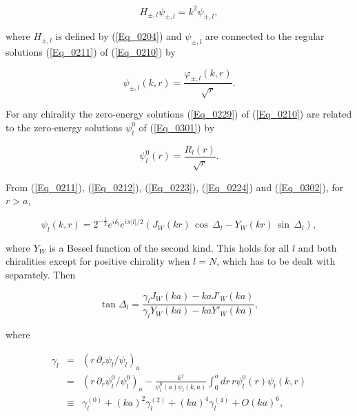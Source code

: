\documentclass[a4paper,twocolumn,showpacs,preprintnumbers,amsmath,amssymb]{revtex4}
\newcommand{\half}{\frac{1}{2}}
\begin{document}
\begin{equation}
\label{Eq_0301}
H_{\pm,l} \psi_{\pm,l} = k^2 \psi_{\pm,l},
\end{equation}

\noindent
where $H_{\pm,l}$ is defined by (\ref{Eq_0204}) and $\psi_{\pm,l}$ are
connected to the regular solutions (\ref{Eq_0211}) of (\ref{Eq_0210}) by

\begin{equation}
\label{Eq_0302}
\psi_{\pm,l}(k,r) = \frac{\varphi_{\pm,l}(k,r)}{\sqrt{r}}.
\end{equation}

\noindent
For any chirality the zero-energy solutions (\ref{Eq_0229}) of
(\ref{Eq_0210}) are related to the zero-energy solutions $\psi^0_l$ of
(\ref{Eq_0301}) by

\begin{equation}
\label{Eq_0303}
\psi^0_l(r) = \frac{R_l(r)}{\sqrt{r}}.
\end{equation}

From (\ref{Eq_0211}), (\ref{Eq_0212}), (\ref{Eq_0223}),
(\ref{Eq_0224}) and (\ref{Eq_0302}), for $r > a$,

\begin{widetext}
\begin{equation}
\label{Eq_0304}
\psi_l(k,r) = 2^{-\half} e^{i\delta_l} e^{i\pi|l|/2}
  (J_W(kr) \, \cos \, \Delta_l - Y_W(kr) \, \sin \, \Delta_l),
\end{equation}
\end{widetext}


\noindent
where $Y_W$ is a Bessel function of the second kind. This holds for
all $l$ and both chiralities except for positive chirality when $l = N$,
which has to be dealt with separately. Then

\begin{equation}
\label{Eq_0305}
\tan \Delta_l =
  \frac{\gamma_l J_W(ka) - ka J'_W(ka)}{\gamma_l Y_W(ka) - ka Y'_W(ka)},
\end{equation}

\noindent
where

\begin{eqnarray}
\label{Eq_0306}
\nonumber
\gamma_l
  &=& (r \, \partial_r \psi_l / \psi_l)_a\\
\nonumber
  &=& (r \, \partial_r \psi^0_l/ \psi^0_l)_a
      - \frac{k^2}{\psi^0_l(a) \psi_l(k,a)}
      \int^a_0 dr \, r \psi^0_l(r) \psi_l(k,r)\\
  &\equiv& \gamma^{(0)}_l + (ka)^2 \gamma^{(2)}_l
      + (ka)^4 \gamma^{(4)}_l + O(ka)^6,
\end{eqnarray}
\end{document}
